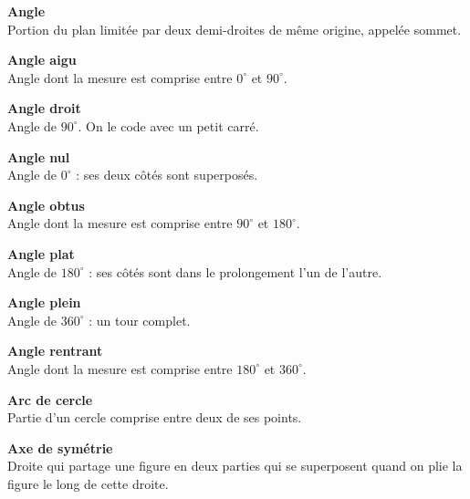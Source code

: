 \begin{tcbraster}[raster columns=2, raster equal height, raster valign=top,raster column skip=2mm, raster row skip=2mm]
\begin{terme}
\textbf{\large Angle}\\[2pt]
{\small Portion du plan limitée par deux demi-droites de même origine, appelée sommet.}
\end{terme}
\begin{terme}
\textbf{\large Angle aigu}\\[2pt]
{\small Angle dont la mesure est comprise entre $0^\circ$ et $90^\circ$.}
\end{terme}
\begin{terme}
\textbf{\large Angle droit}\\[2pt]
{\small Angle de $90^\circ$. On le code avec un petit carré.}
\end{terme}
\begin{terme}
\textbf{\large Angle nul}\\[2pt]
{\small Angle de $0^\circ$ : ses deux côtés sont superposés.}
\end{terme}
\begin{terme}
\textbf{\large Angle obtus}\\[2pt]
{\small Angle dont la mesure est comprise entre $90^\circ$ et $180^\circ$.}
\end{terme}
\begin{terme}
\textbf{\large Angle plat}\\[2pt]
{\small Angle de $180^\circ$ : ses côtés sont dans le prolongement l'un de l'autre.}
\end{terme}
\begin{terme}
\textbf{\large Angle plein}\\[2pt]
{\small Angle de $360^\circ$ : un tour complet.}
\end{terme}
\begin{terme}
\textbf{\large Angle rentrant}\\[2pt]
{\small Angle dont la mesure est comprise entre $180^\circ$ et $360^\circ$.}
\end{terme}
\begin{terme}
\textbf{\large Arc de cercle}\\[2pt]
{\small Partie d'un cercle comprise entre deux de ses points.}
\end{terme}
\begin{terme}
\textbf{\large Axe de symétrie}\\[2pt]
{\small Droite qui partage une figure en deux parties qui se superposent quand on plie la figure le long de cette droite.}

\end{terme}
\end{tcbraster}
